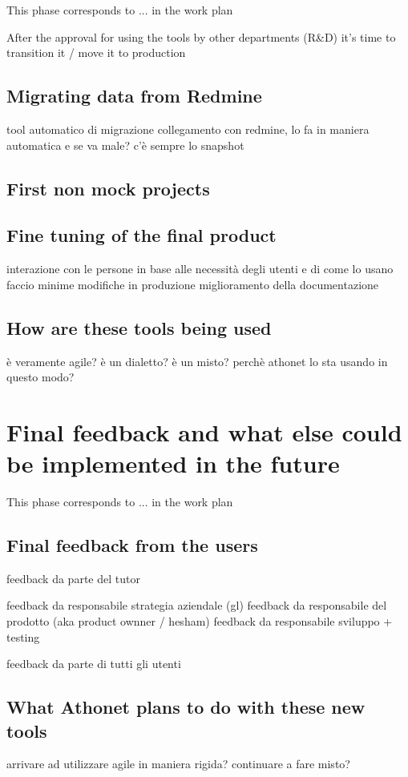 	This phase corresponds to ... in the work plan

	After the approval for using the tools by other departments (R\&D) it's time to transition it / move it to production
	
	\subsection{Migrating data from Redmine}
		tool automatico di migrazione
		collegamento con redmine, lo fa in maniera automatica
		e se va male? c'è sempre lo snapshot
	
	\subsection{First non mock projects}
	
	\subsection{Fine tuning of the final product}
		interazione con le persone
		in base alle necessità degli utenti e di come lo usano faccio minime modifiche in produzione
		miglioramento della documentazione
	
	\subsection{How are these tools being used}
		è veramente agile? 
		è un dialetto?
		è un misto?
		perchè athonet lo sta usando in questo modo?

\section{Final feedback and what else could be implemented in the future}

	This phase corresponds to ... in the work plan

	\subsection{Final feedback from the users}
		feedback da parte del tutor
		
		feedback da responsabile strategia aziendale (gl)
		feedback da responsabile del prodotto (aka product ownner / hesham)
		feedback da responsabile sviluppo + testing
			
		feedback da parte di tutti gli utenti
	
	\subsection{What Athonet plans to do with these new tools}
		arrivare ad utilizzare agile in maniera rigida?
		continuare a fare misto?
